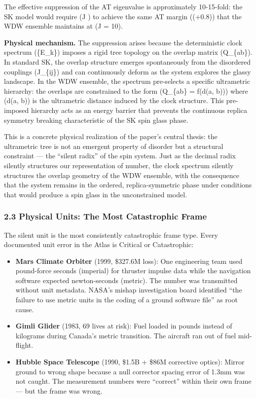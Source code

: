 \documentclass[
]{article}
\begin{document}
The effective suppression of the AT eigenvalue is approximately
10-15-fold: the SK model would require (\beta J ) to achieve the
same AT margin ((\lambda \approx +0.8)) that the WDW ensemble maintains
at (\beta J = 10).

\textbf{Physical mechanism.} The suppression arises because the
deterministic clock spectrum (\{E\_k\}) imposes a rigid tree topology on
the overlap matrix (Q\_\{ab\}). In standard SK, the overlap structure
emerges spontaneously from the disordered couplings (J\_\{ij\}) and can
continuously deform as the system explores the glassy landscape. In the
WDW ensemble, the spectrum pre-selects a specific ultrametric hierarchy:
the overlaps are constrained to the form (Q\_\{ab\} = f(d(a, b))) where
(d(a, b)) is the ultrametric distance induced by the clock structure.
This pre-imposed hierarchy acts as an energy barrier that prevents the
continuous replica symmetry breaking characteristic of the SK spin glass
phase.

This is a concrete physical realization of the paper's central thesis:
the ultrametric tree is not an emergent property of disorder but a
structural constraint --- the ``silent radix'' of the spin system. Just
as the decimal radix silently structures our representation of number,
the clock spectrum silently structures the overlap geometry of the WDW
ensemble, with the consequence that the system remains in the ordered,
replica-symmetric phase under conditions that would produce a spin glass
in the unconstrained model.

\subsubsection{2.3 Physical Units: The Most Catastrophic
Frame}\label{physical-units-the-most-catastrophic-frame}

The silent unit is the most consistently catastrophic frame type. Every
documented unit error in the Atlas is Critical or Catastrophic:

\begin{itemize}
\item
  \textbf{Mars Climate Orbiter} (1999, \$327.6M loss): One engineering
  team used pound-force seconds (imperial) for thruster impulse data
  while the navigation software expected newton-seconds (metric). The
  number was transmitted without unit metadata. NASA's mishap
  investigation board identified ``the failure to use metric units in
  the coding of a ground software file'' as root cause.
\item
  \textbf{Gimli Glider} (1983, 69 lives at risk): Fuel loaded in pounds
  instead of kilograms during Canada's metric transition. The aircraft
  ran out of fuel mid-flight.
\item
  \textbf{Hubble Space Telescope} (1990, \$1.5B + \$86M corrective
  optics): Mirror ground to wrong shape because a null corrector spacing
  error of 1.3mm was not caught. The measurement numbers were
  ``correct'' within their own frame --- but the frame was wrong.
\end{itemize}
\end{document}
